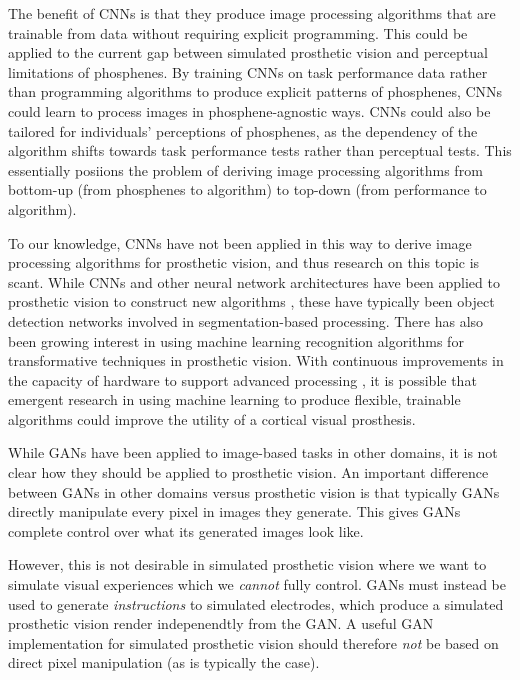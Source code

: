 \documentclass[a4paper,11pt,openany]{book}
\begin{document}
The benefit of CNNs is that they produce image processing algorithms that are trainable from data without requiring explicit programming.
This could be applied to the current gap between simulated prosthetic vision and perceptual limitations of phosphenes.
By training CNNs on task performance data rather than programming algorithms to produce explicit patterns of phosphenes, CNNs could learn to process images in phosphene-agnostic ways.
CNNs could also be tailored for individuals' perceptions of phosphenes, as the dependency of the algorithm shifts towards task performance tests rather than perceptual tests.
This essentially posiions the problem of deriving image processing algorithms from bottom-up (from phosphenes to algorithm) to top-down (from performance to algorithm).

To our knowledge, CNNs have not been applied in this way to derive image processing algorithms for prosthetic vision, and thus research on this topic is scant.
While CNNs and other neural network architectures have been applied to prosthetic vision to construct new algorithms \cite{mace_simulated_2015,ge_spiking_2017,sanchez-garcia_structural_2018}, these have typically been object detection networks involved in segmentation-based processing.
There has also been growing interest in using machine learning recognition algorithms for transformative techniques in prosthetic vision. \cite{chichilnisky_eduardo-jose_smart_2018}
With continuous improvements in the capacity of hardware to support advanced processing \cite{moore_cramming_1998}, it is possible that emergent research in using machine learning to produce flexible, trainable algorithms could improve the utility of a cortical visual prosthesis.

While GANs have been applied to image-based tasks in other domains, it is not clear how they should be applied to prosthetic vision.
An important difference between GANs in other domains versus prosthetic vision is that typically GANs directly manipulate every pixel in images they generate.
This gives GANs complete control over what its generated images look like.

However, this is not desirable in simulated prosthetic vision where we want to simulate visual experiences which we \emph{cannot} fully control.
GANs must instead be used to generate \emph{instructions} to simulated electrodes, which produce a simulated prosthetic vision render indepenendtly from the GAN.
A useful GAN implementation for simulated prosthetic vision should therefore \emph{not} be based on direct pixel manipulation (as is typically the case).
\end{document}
